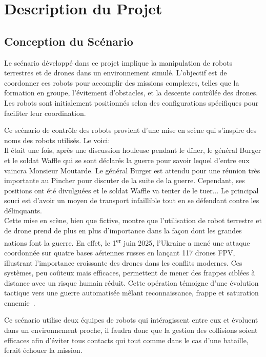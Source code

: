 \documentclass[a4paper,12pt]{article}
\begin{document}
\section*{Description du Projet}
\subsection*{Conception du Scénario}
Le scénario développé dans ce projet implique la manipulation de robots terrestres et de drones dans un environnement simulé. L'objectif est de coordonner ces robots pour accomplir des missions complexes, telles que la formation en groupe, l'évitement d'obstacles, et la descente contrôlée des drones. Les robots sont initialement positionnés selon des configurations spécifiques pour faciliter leur coordination.

Ce scénario de contrôle des robots provient d'une mise en scène qui s'inspire des noms des robots utilisés. Le voici:\\

Il était une fois, après une discussion houleuse pendant le dîner, le général Burger et le soldat Waffle qui se sont déclarés la guerre pour savoir lequel d'entre eux vaincra Monsieur Moutarde.
Le général Burger est attendu pour une réunion très importante au Pincher pour discuter de la suite de la guerre. Cependant, ses positions ont été divulguées et le soldat Waffle va tenter de le tuer...  Le principal souci est d'avoir un moyen de transport infaillible tout en se défendant contre les délinquants.\\

Cette mise en scène, bien que fictive, montre que l'utilisation de robot terrestre et de drone prend de plus en plus d'importance dans la façon dont les grandes nations font la guerre. 
En effet, le 1\textsuperscript{er} juin 2025, l'Ukraine a mené une attaque coordonnée sur quatre bases aériennes russes en lançant 117 drones FPV, illustrant l'importance croissante des drones dans les conflits modernes. Ces systèmes, peu coûteux mais efficaces, permettent de mener des frappes ciblées à distance avec un risque humain réduit. Cette opération témoigne d'une évolution tactique vers une guerre automatisée mêlant reconnaissance, frappe et saturation ennemie~\cite{lemonde2025}.

Ce scénario utilise deux équipes de robots qui intéragissent entre eux et évoluent dans un environnement proche, il faudra donc que la gestion des collisions soient efficaces afin d'éviter tous contacts qui tout comme dans le cas d'une bataille, ferait échouer la mission.
\end{document}
